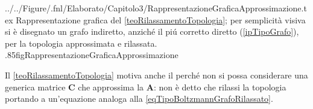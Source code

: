         {../../Figure/.fnl/Elaborato/Capitolo3/RappresentazioneGraficaApprossimazione.tex}
        {Rappresentazione grafica del \cref{teoRilassamentoTopologia}; per semplicità visiva si è disegnato un grafo indiretto, anziché il piú corretto diretto (\cref{ipTipoGrafo}), per la topologia approssimata e rilassata.}
        {.85\linewidth}{figRappresentazioneGraficaApprossimazione}
      
      \begin{oss}
        Il \cref{teoRilassamentoTopologia} motiva anche il perché non si possa considerare una generica matrice \(\mathbf C\) che approssima la \(\mathbf A\): non è detto che rilassi la topologia portando a un'equazione analoga alla \ref{eqTipoBoltzmannGrafoRilassato}.
      \end{oss}

